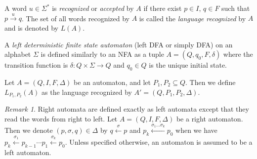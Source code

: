 \documentclass[12pt]{report}
\theoremstyle{definition}
\theoremstyle{remark}
\newtheorem{rmk}{Remark}[section]
\begin{document}
A word $u\in \Sigma^\ast$ is \emph{recognized} or \emph{accepted} by $A$ if there exist $p\in I$, $q\in F$ such that $p\xrightarrow u q$. The set of all words recognized by $A$ is called the \emph{language recognized} by $A$ and is denoted by $L(A)$.

A \emph{left deterministic finite state automaton} (left DFA or simply DFA) on an alphabet $\Sigma$ is defined similarly to an NFA as a tuple $A=(Q,q_0,F,\delta)$ where the transition function is $\delta: Q\times\Sigma\rightarrow Q$ and $q_0\in Q$ is the unique initial state.

Let $A=\left(Q,I,F,\Delta \right)$ be an automaton, and let $P_1,P_2\subseteq Q$. Then we define $L_{P_1,P_2}(A)$ as the language recognized by $A'=\left(Q,P_1,P_2,\Delta \right)$.

\begin{rmk}
Right automata are defined exactly as left automata except that they read the words from right to left.
Let $A=\left(Q,I,F,\Delta \right)$ be a right automaton.
Then we denote $(p,\sigma,q)\in \Delta$ by $q\xleftarrow \sigma p$ and
$p_k\xleftarrow{\sigma_1\ldots\sigma_k} p_0$ when we have $p_k\xleftarrow{\sigma_1} p_{k-1}\cdots p_{1}\xleftarrow{\sigma_k} p_0$.
Unless specified otherwise, an automaton is assumed to be a left automaton.

\end{rmk}
\end{document}
